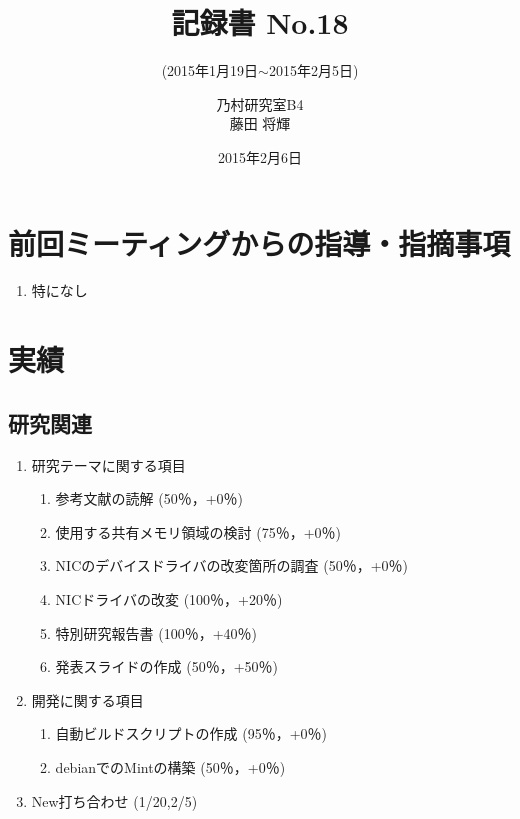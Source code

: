 \documentclass[fleqn, 14pt]{extarticle}
\subtitle{(2015年1月19日$\sim$2015年2月5日)}
\author{乃村研究室B4\\藤田 将輝}
\date{2015年2月6日}
\title{記録書 No.18}
\begin{document}
\maketitle
\section{前回ミーティングからの指導・指摘事項}
\label{sec-1}
\begin{enumerate}
\item 特になし
\newline
\hfill

\end{enumerate}




\section{実績}
\label{sec-2}

\subsection{研究関連}
\label{sec-2-1}
\begin{enumerate}
    \item 研究テーマに関する項目
    \hfill
    \label{enum-research1}
    \begin{enumerate}

        \item 参考文献の読解
        \hfill
        \label{enum-1-A}
        (50％，+0％)
        \item 使用する共有メモリ領域の検討
        \hfill
        \label{enum-1-B}
        (75％，+0％)
        \item NICのデバイスドライバの改変箇所の調査
        \hfill
        \label{enum-1-C}
        (50％，+0％)
        \item NICドライバの改変
        \hfill
        \label{enum-1-D}
        (100％，+20％)
        \item 特別研究報告書
        \hfill
        \label{enum-1-E}
        (100％，+40％)
        \item 発表スライドの作成 
        \hfill
        \label{enum-1-F}
        (50％，+50％)
    \end{enumerate}
    \item 開発に関する項目
    \hfill
    \label{enum-research2}
    \begin{enumerate}

        \item 自動ビルドスクリプトの作成
        \hfill
        \label{enum-2-A}
        (95％，+0％)
        \item debianでのMintの構築
        \hfill
        \label{enum-2-A}
        (50％，+0％)
    \end{enumerate}
    \item New打ち合わせ 
    \hfill
    \label{enum-research3}
    (1/20,2/5)
    \end{enumerate}
\end{document}
